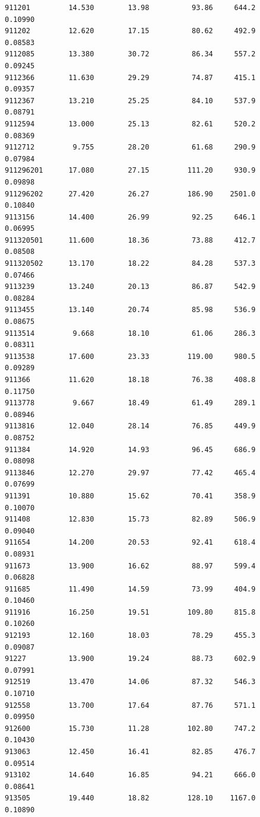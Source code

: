 \documentclass[
  letterpaper,
  DIV=11,
  numbers=noendperiod]{scrartcl}
\begin{document}
\begin{verbatim}
911201         14.530        13.98          93.86     644.2         0.10990
911202         12.620        17.15          80.62     492.9         0.08583
9112085        13.380        30.72          86.34     557.2         0.09245
9112366        11.630        29.29          74.87     415.1         0.09357
9112367        13.210        25.25          84.10     537.9         0.08791
9112594        13.000        25.13          82.61     520.2         0.08369
9112712         9.755        28.20          61.68     290.9         0.07984
911296201      17.080        27.15         111.20     930.9         0.09898
911296202      27.420        26.27         186.90    2501.0         0.10840
9113156        14.400        26.99          92.25     646.1         0.06995
911320501      11.600        18.36          73.88     412.7         0.08508
911320502      13.170        18.22          84.28     537.3         0.07466
9113239        13.240        20.13          86.87     542.9         0.08284
9113455        13.140        20.74          85.98     536.9         0.08675
9113514         9.668        18.10          61.06     286.3         0.08311
9113538        17.600        23.33         119.00     980.5         0.09289
911366         11.620        18.18          76.38     408.8         0.11750
9113778         9.667        18.49          61.49     289.1         0.08946
9113816        12.040        28.14          76.85     449.9         0.08752
911384         14.920        14.93          96.45     686.9         0.08098
9113846        12.270        29.97          77.42     465.4         0.07699
911391         10.880        15.62          70.41     358.9         0.10070
911408         12.830        15.73          82.89     506.9         0.09040
911654         14.200        20.53          92.41     618.4         0.08931
911673         13.900        16.62          88.97     599.4         0.06828
911685         11.490        14.59          73.99     404.9         0.10460
911916         16.250        19.51         109.80     815.8         0.10260
912193         12.160        18.03          78.29     455.3         0.09087
91227          13.900        19.24          88.73     602.9         0.07991
912519         13.470        14.06          87.32     546.3         0.10710
912558         13.700        17.64          87.76     571.1         0.09950
912600         15.730        11.28         102.80     747.2         0.10430
913063         12.450        16.41          82.85     476.7         0.09514
913102         14.640        16.85          94.21     666.0         0.08641
913505         19.440        18.82         128.10    1167.0         0.10890

\end{verbatim}
\end{document}
